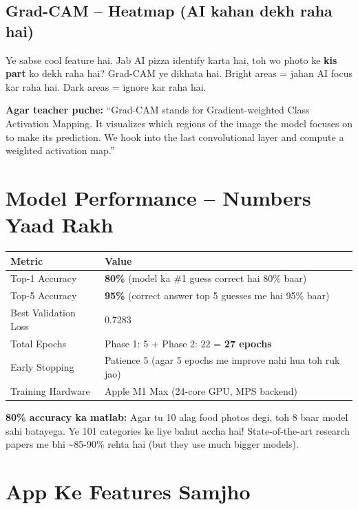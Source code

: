 \documentclass[11pt,a4paper]{article}
\begin{document}
\subsection{Grad-CAM -- Heatmap (AI kahan dekh raha hai)}
Ye sabse cool feature hai. Jab AI pizza identify karta hai, toh wo photo ke \textbf{kis part} ko dekh raha hai? Grad-CAM ye dikhata hai. Bright areas = jahan AI focus kar raha hai. Dark areas = ignore kar raha hai.

\textbf{Agar teacher puche:} ``Grad-CAM stands for Gradient-weighted Class Activation Mapping. It visualizes which regions of the image the model focuses on to make its prediction. We hook into the last convolutional layer and compute a weighted activation map.''

\section{Model Performance -- Numbers Yaad Rakh}

\begin{tabularx}{\textwidth}{lX}
\toprule
\textbf{Metric} & \textbf{Value} \\
\midrule
Top-1 Accuracy & \textbf{80\%} (model ka \#1 guess correct hai 80\% baar) \\
Top-5 Accuracy & \textbf{95\%} (correct answer top 5 guesses me hai 95\% baar) \\
Best Validation Loss & 0.7283 \\
Total Epochs & Phase 1: 5 + Phase 2: 22 = \textbf{27 epochs} \\
Early Stopping & Patience 5 (agar 5 epochs me improve nahi hua toh ruk jao) \\
Training Hardware & Apple M1 Max (24-core GPU, MPS backend) \\
\bottomrule
\end{tabularx}

\begin{tipbox}
\textbf{80\% accuracy ka matlab:} Agar tu 10 alag food photos degi, toh 8 baar model sahi batayega. Ye 101 categories ke liye bahut accha hai! State-of-the-art research papers me bhi \textasciitilde85-90\% rehta hai (but they use much bigger models).
\end{tipbox}

\section{App Ke Features Samjho}
\end{document}
